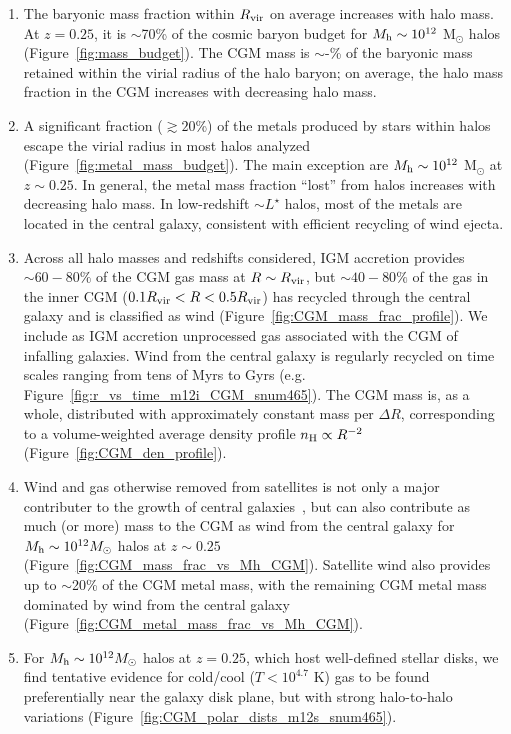 \documentclass[fleqn,usenatbib]{mnras}
\begin{document}
\begin{enumerate}
\item The baryonic mass fraction within $R_{\rm vir}$ on average increases with halo mass.
At $z=0.25$, it is $\sim$70\% of the cosmic baryon budget for $M_{\rm h}\sim 10^{12}$ M$_{\odot}$ halos (Figure~\ref{fig:mass_budget}).
The CGM mass is $\sim$\fCGMMWmeanlow-\fCGMdwarfmeanlow\% of the baryonic mass retained within the virial radius of the halo baryon; on average, the halo mass fraction in the CGM increases with decreasing halo mass.
\item A significant fraction ($\gtrsim 20$\%) of the metals produced by stars within halos escape the virial radius in most halos analyzed (Figure~\ref{fig:metal_mass_budget}). 
The main exception are $M_{\rm h}\sim 10^{12}$ M$_{\odot}$ at $z\sim0.25$. 
In general, the metal mass fraction ``lost'' from halos increases with decreasing halo mass. 
In low-redshift $\sim L^{\star}$ halos, most of the metals are located in the central galaxy, consistent with efficient recycling of wind ejecta. 
\item Across all halo masses and redshifts considered, IGM accretion provides $\sim 60-80\%$ of the CGM gas mass at $R \sim R_{\rm vir}$, but $\sim 40-80 \%$ of the gas in the inner CGM ($0.1R_{\rm vir}<R<0.5R_{\rm vir}$) has recycled through the central galaxy and is classified as wind (Figure~\ref{fig:CGM_mass_frac_profile}).
We include as IGM accretion unprocessed gas associated with the CGM of infalling galaxies.
Wind from the central galaxy is regularly recycled on time scales ranging from tens of Myrs to Gyrs (e.g. Figure~\ref{fig:r_vs_time_m12i_CGM_snum465}). 
The CGM mass is, as a whole, distributed with approximately constant mass per $\Delta R$, corresponding to a volume-weighted average density profile $n_{\rm H} \propto R^{-2}$ (Figure~\ref{fig:CGM_den_profile}). 
\item Wind and gas otherwise removed from satellites is not only a major contributer to the growth of central galaxies~\citep{Angles-Alcazar2017}, but can also contribute as much (or more) mass to the CGM as wind from the central galaxy for $M_{\rm h} \sim 10^{12} M_\odot$ halos at $z\sim0.25$ (Figure~\ref{fig:CGM_mass_frac_vs_Mh_CGM}). 
Satellite wind also provides up to $\sim$20\% of the CGM metal mass, with the remaining CGM metal mass dominated by wind from the central galaxy (Figure~\ref{fig:CGM_metal_mass_frac_vs_Mh_CGM}). 
\item For $M_{\rm h} \sim 10^{12} M_\odot$ halos at $z=0.25$, which host well-defined stellar disks, we find tentative evidence for cold/cool ($T < 10^{4.7}$ K) gas to be found preferentially near the galaxy disk plane, but with strong halo-to-halo variations (Figure~\ref{fig:CGM_polar_dists_m12s_snum465}).

\end{enumerate}
\end{document}
